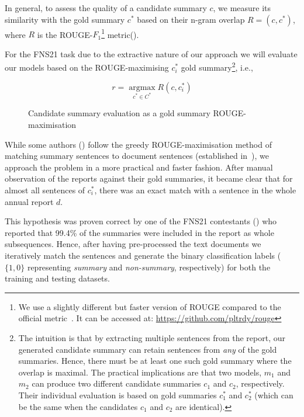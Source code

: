 In general, to assess the quality of a candidate summary $c$, we measure its similarity with the gold summary $c^{*}$ based on their n-gram overlap $R=(c, c^{*})$, where $R$ is the ROUGE-$F_{1}$\footnote{
    We use a slightly different but faster version of ROUGE compared to the official metric~\cite{lin2004rouge}.
    It can be accessed at: \url{https://github.com/pltrdy/rouge}
    } metric(\cite{lin2004rouge}).

For the FNS21 task due to the extractive nature of our approach we will evaluate our models based on the ROUGE-maximising $c^{*}_{i}$ gold summary\footnote{
    The intuition is that by extracting multiple sentences from the report, our generated candidate summary can retain sentences from \emph{any} of the gold summaries. 
    Hence, there must be at least one such gold summary where the overlap is maximal.
    The practical implications are that two models, $m_{1}$ and $m_{2}$ can produce two different candidate summaries $c_{1}$ and $c_{2}$, respectively.
    Their individual evaluation is based on gold summaries $c^{*}_{1}$ and $c^{*}_{2}$ (which can be the same when the candidates $c_{1}$ and $c_{2}$ are identical).
}, i.e.,

\begin{figure}[h]
    \centering
    \begin{equation}\label{eq:rouge_max}
        r = \underset{c^{*} \in C^{*}}{\operatorname{argmax}} R(c, c^{*}_{i})
    \end{equation}
    \caption{Candidate summary evaluation as a gold summary ROUGE-maximisation}
    \label{fig:rouge_max}
\end{figure}


While some authors (\cite{zmandar-etal-2021-joint}) follow the greedy ROUGE-maximisation method of matching summary sentences to document sentences (established in~\cite{nallapati2017summarunner}), we approach the problem in a more practical and faster fashion.
After manual observation of the reports against their gold summaries, it became clear that for almost all sentences of $c^{*}_{i}$, there was an exact match with a sentence in the whole annual report $d$.

This hypothesis was proven correct by one of the FNS21 contestants (\cite{orzhenovskii-2021-t5}) who reported that 99.4\% of the summaries were included in the
report as whole subsequences.
Hence, after having pre-processed the text documents we iteratively match the sentences and generate the binary classification labels ($\{1,0\}$ representing \emph{summary} and \emph{non-summary}, respectively) for both the training and testing datasets.
